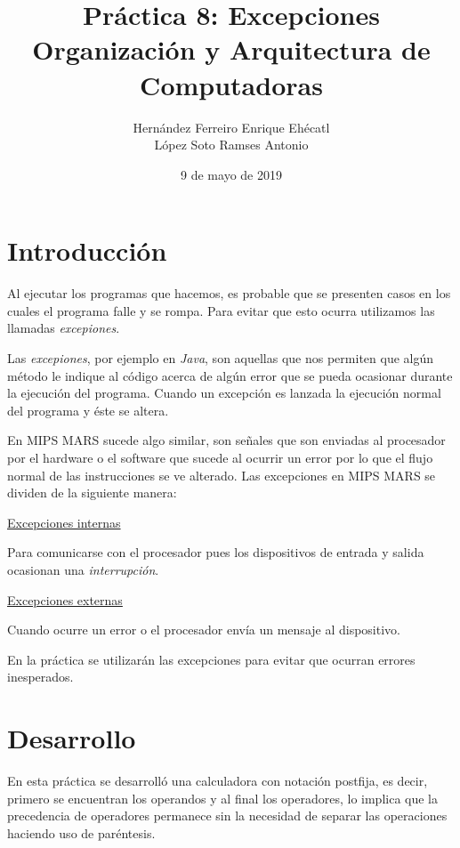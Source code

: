 \documentclass[12pt, letterpaper]{article}
\author{Hernández Ferreiro Enrique Ehécatl \\
          López Soto Ramses Antonio}
\title{Práctica 8: Excepciones \\
                {\small Organización y Arquitectura de Computadoras}}
\date{9 de mayo de 2019}
\begin{document}
    \maketitle
    \section{Introducción}
    Al ejecutar los programas que hacemos, es probable que se presenten casos en
    los cuales el programa falle y se rompa. Para evitar que esto ocurra utilizamos
    las llamadas \textit{excepiones}. \vspace{.1cm}

    Las \textit{excepiones}, por ejemplo en \textit{Java}, son aquellas que nos
    permiten que algún método le indique al código acerca de algún error que se
    pueda ocasionar durante la ejecución del programa. Cuando un excepción es
    lanzada la ejecución normal del programa y éste se altera.\vspace{.1cm}

    En MIPS MARS sucede algo similar, son señales que son enviadas al procesador
    por el hardware o el software que sucede al ocurrir un error por lo que el
    flujo normal de las instrucciones se ve alterado. Las excepciones en MIPS MARS
    se dividen de la siguiente manera:\vspace{.1cm}

    \begin{item}
      \item \underline{Excepciones internas} \vspace{.1cm}

            Para comunicarse con el procesador pues los dispositivos de entrada
            y salida ocasionan una \textit{interrupción}.

      \item \underline{Excepciones externas} \vspace{.1cm}

            Cuando ocurre un error o el procesador envía un mensaje al
            dispositivo.

    \end{item}\vspace{.1cm}



    En la práctica se utilizarán las excepciones para evitar que ocurran errores
    inesperados.\vspace{.3cm}

    \section{Desarrollo}
    En esta práctica se desarrolló una calculadora con notación postfija, es decir,
    primero se encuentran los operandos y al final los operadores, lo implica que
    la precedencia de operadores permanece sin la necesidad de separar las
    operaciones haciendo uso de paréntesis.\vspace{.1cm}
\end{document}
